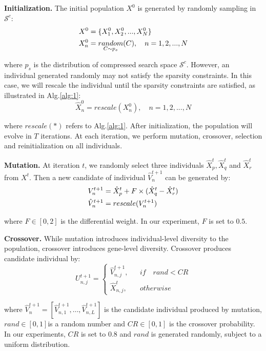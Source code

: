 \documentclass[final]{cvpr}
\begin{document}
\textbf{Initialization.} The initial population $X^0$ is generated by randomly sampling in $\mathcal{S}^c$:
\begin{align}
    X^0 &= \{ X_1^0, X_2^0,..., X_N^0\} \notag\\
    X_n^0 &= \mathop{random} \limits_{C\sim p_{s}} (C), \quad n=1,2,...,N \label{eq8}
\end{align}

\noindent where $p_{s}$ is the distribution of compressed search space $\mathcal{S}^c$. However, an individual generated randomly may not satisfy the sparsity constraints.
In this case, we will rescale the individual until the sparsity constraints are satisfied, as illustrated in Alg.\ref{alg:1}: 
\begin{equation}
    \hat{X}_n^0 = rescale(X_n^0),\quad n=1,2,...,N \label{eq9}
\end{equation}

\noindent where $rescale(*)$ refers to Alg.\ref{alg:1}. After initialization, the population will evolve in $T$ iterations. At each iteration, we perform mutation, 
crossover, selection and reinitialization on all individuals.

\textbf{Mutation.} At iteration $t$, we randomly select three individuals $\hat{X}_p^t,\hat{X}_q^t$ and $\hat{X}_r^t$ from $X^t$. 
Then a new candidate of individual $\hat{V}_n^{t+1}$ can be generated by: 
\begin{align}
    V_n^{t+1} &= \hat{X}_p^t + F \times (\hat{X}_q^t-\hat{X}_r^t) \notag\\
    \hat{V}_n^{t+1} &= rescale(V_n^{t+1})  \label{eq10}
\end{align}

\noindent where $F\in[0,2]$ is the differential weight. In our experiment, $F$ is set to $0.5$.

\textbf{Crossover.} While mutation introduces individual-level diversity to the population, crossover introduces gene-level diversity. 
Crossover produces candidate individual by:
\begin{equation}
    U_{n,j}^{t+1} = \left\{  
        \begin{array}{rcl}  
        \hat{V}_{n,j}^{t+1},&   & if \quad rand < CR \\
        \hat{X}_{n,j}^t,&       & otherwise
    \end{array}  
\right.  \label{eq11}
\end{equation}

\noindent where $\hat{V}_n^{t+1}=[\hat{V}_{n,1}^{t+1},…,\hat{V}_{n,L}^{t+1}]$ is the candidate individual produced by mutation, 
$rand \in [0,1]$is a random number and $CR \in [0,1]$ is the crossover probability. In our experiments, $CR$ is set to $0.8$ and
$rand$ is generated randomly, subject to a uniform distribution. 
\end{document}
